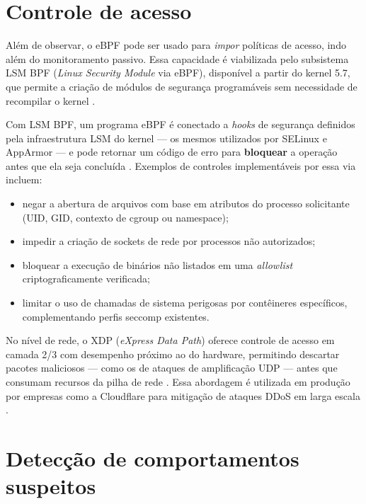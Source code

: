 \section{Controle de acesso}

Além de observar, o eBPF pode ser usado para \textit{impor} políticas de acesso,
indo além do monitoramento passivo.
Essa capacidade é viabilizada pelo subsistema LSM BPF (\textit{Linux Security Module}
via eBPF), disponível a partir do kernel 5.7, que permite a criação de módulos de
segurança programáveis sem necessidade de recompilar o kernel
\cite{linuxkernel2024}.

Com LSM BPF, um programa eBPF é conectado a \textit{hooks} de segurança definidos
pela infraestrutura LSM do kernel — os mesmos utilizados por SELinux e AppArmor —
e pode retornar um código de erro para \textbf{bloquear} a operação antes que ela
seja concluída \cite{gregg2019}.
Exemplos de controles implementáveis por essa via incluem:

\begin{itemize}
  \item negar a abertura de arquivos com base em atributos do processo solicitante
        (UID, GID, contexto de cgroup ou namespace);
  \item impedir a criação de sockets de rede por processos não autorizados;
  \item bloquear a execução de binários não listados em uma \textit{allowlist}
        criptograficamente verificada;
  \item limitar o uso de chamadas de sistema perigosas por contêineres específicos,
        complementando perfis seccomp existentes.
\end{itemize}

No nível de rede, o XDP (\textit{eXpress Data Path}) oferece controle de acesso
em camada 2/3 com desempenho próximo ao do hardware, permitindo descartar pacotes
maliciosos — como os de ataques de amplificação UDP — antes que consumam recursos
da pilha de rede \cite{linuxkernel2024}.
Essa abordagem é utilizada em produção por empresas como a Cloudflare para mitigação
de ataques DDoS em larga escala \cite{ebpfexporter}.

\section{Detecção de comportamentos suspeitos}

